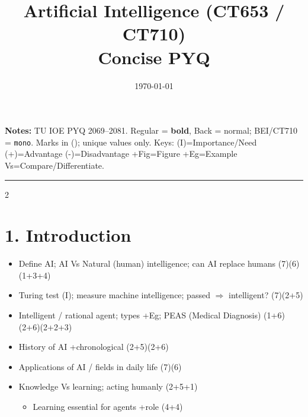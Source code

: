 \documentclass[10pt]{article}
\title{Artificial Intelligence (CT653 / CT710)\\[0.3em]\large Concise PYQ}
\author{}
\date{\today}
\begin{document}
\maketitle
\vspace{-1em}
\small
\textbf{Notes:} TU IOE PYQ 2069--2081. Regular = \textbf{bold}, Back = normal; BEI/CT710 = \texttt{mono}.
Marks in (); unique values only.
Keys: (I)=Importance/Need \quad (+)=Advantage \quad (-)=Disadvantage \quad +Fig=Figure \quad +Eg=Example \quad Vs=Compare/Differentiate.
\vspace{2pt}
\hrule
\vspace{4pt}

\begin{multicols}{2}
\footnotesize

\section*{1. Introduction}
\begin{itemize}
  \item Define AI; AI Vs Natural (human) intelligence; can AI replace humans \hfill (7)(6)(1+3+4)
  \item Turing test (I); measure machine intelligence; passed $\Rightarrow$ intelligent? \hfill (7)(2+5)
  \item Intelligent / rational agent; types +Eg; PEAS (Medical Diagnosis) \hfill (1+6)(2+6)(2+2+3)
  \item History of AI +chronological \hfill (2+5)(2+6)
  \item Applications of AI / fields in daily life \hfill (7)(6)
  \item Knowledge Vs learning; acting humanly \hfill (2+5+1)
    \begin{itemize}
      \item Learning essential for agents +role \hfill (4+4)
    \end{itemize}
\end{itemize}


\end{multicols}
\end{document}
